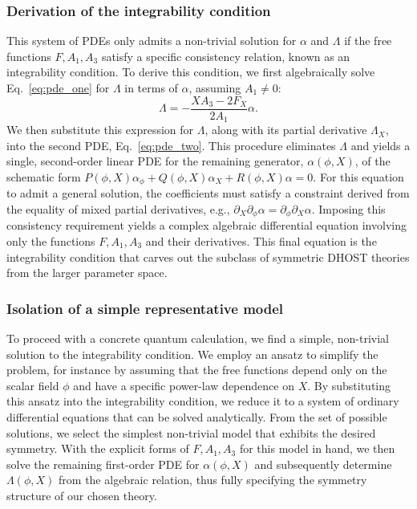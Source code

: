 \documentclass[twocolumn]{aastex631}
\begin{document}
\subsubsection{Derivation of the integrability condition}
This system of PDEs only admits a non-trivial solution for $\alpha$ and $\Lambda$ if the free functions $F, A_1, A_3$ satisfy a specific consistency relation, known as an integrability condition. To derive this condition, we first algebraically solve Eq.~\eqref{eq:pde_one} for $\Lambda$ in terms of $\alpha$, assuming $A_1 \neq 0$:
\begin{equation}
    \Lambda = - \frac{X A_3 - 2 F_X}{2 A_1} \alpha.
\end{equation}
We then substitute this expression for $\Lambda$, along with its partial derivative $\Lambda_X$, into the second PDE, Eq.~\eqref{eq:pde_two}. This procedure eliminates $\Lambda$ and yields a single, second-order linear PDE for the remaining generator, $\alpha(\phi, X)$, of the schematic form $P(\phi,X) \alpha_\phi + Q(\phi,X) \alpha_X + R(\phi,X) \alpha = 0$. For this equation to admit a general solution, the coefficients must satisfy a constraint derived from the equality of mixed partial derivatives, e.g., $\partial_X \partial_\phi \alpha = \partial_\phi \partial_X \alpha$. Imposing this consistency requirement yields a complex algebraic differential equation involving only the functions $F, A_1, A_3$ and their derivatives. This final equation is the integrability condition that carves out the subclass of symmetric DHOST theories from the larger parameter space.

\subsubsection{Isolation of a simple representative model}
To proceed with a concrete quantum calculation, we find a simple, non-trivial solution to the integrability condition. We employ an ansatz to simplify the problem, for instance by assuming that the free functions depend only on the scalar field $\phi$ and have a specific power-law dependence on $X$. By substituting this ansatz into the integrability condition, we reduce it to a system of ordinary differential equations that can be solved analytically. From the set of possible solutions, we select the simplest non-trivial model that exhibits the desired symmetry. With the explicit forms of $F, A_1, A_3$ for this model in hand, we then solve the remaining first-order PDE for $\alpha(\phi, X)$ and subsequently determine $\Lambda(\phi, X)$ from the algebraic relation, thus fully specifying the symmetry structure of our chosen theory.
\end{document}
